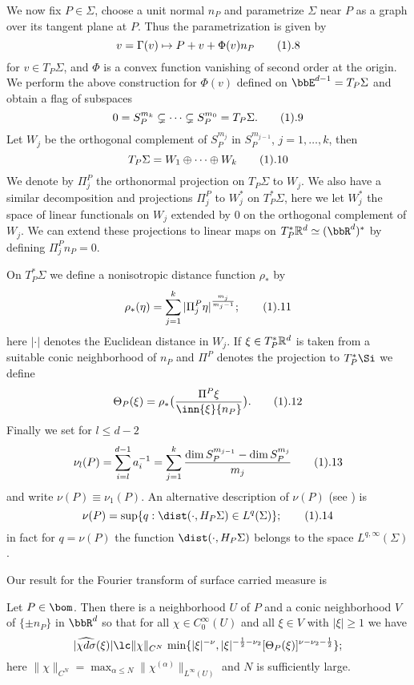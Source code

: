 We now fix  $P\in \Sigma$, choose a unit normal
$n_P$ and parametrize $\Sigma$ near $P$ as  a graph over 
its tangent plane at $P$. Thus the parametrization is given by
$$v=\Gamma(v)\mapsto P+v+ \Phi(v) n_P
\tag 1.8
$$ for $v\in T_P\Sigma$, and 
 $\Phi$ is a convex function  vanishing of second order at the origin.
We perform the above construction for $\Phi(v)$  defined on 
$\bbE^{d-1}=T_P\Sigma$ and obtain a flag of subspaces
$$0=S^{m_k}_P\subsetneq\dots \subsetneq S^{m_0}_P= T_P\Sigma. 
\tag 1.9
$$
%
Let  $W_j$ be the orthogonal complement of
$S^{m_{j}}_P$ in $S^{m_{j-1}}_P$, $j=1,\dots,k$, then
$$
T_P\Sigma= W_1\oplus\cdots\oplus W_{k}
\tag 1.10
$$
We denote by $\Pi_j^P$ the orthonormal projection on $T_P\Sigma$  to
$W_j$.
We also have a similar decomposition and projections $\Pi_j^P$ to $W_j^*$
on $T^*_P\Sigma$, here we let $W_j^*$ the space of linear functionals 
on $W_j$ extended by $0$ on the orthogonal complement of $W_j$.
We can extend these projections to linear maps  on 
$T_P^*\Bbb R^d\simeq (\bbR^d)^*$ by
defining $\Pi_j^P n_P=0$.


On $T_P^*\Sigma$ we define a nonisotropic  distance function $\rho_*$ by
$$
\rho_*(\eta)=
\sum_{j=1}^k 
|\Pi_j^P\eta|^{\frac{m_j}{m_j-1}};
\tag 1.11
$$
here $|\cdot|$ denotes the Euclidean distance in $W_j$.
If $\xi\in T_P^*\Bbb R^d$ is taken from a suitable 
 conic neighborhood of  $n_P$ and $\Pi^P$ denotes the  projection
to $T_P^*\Si$ 
 we define
 $$\Theta_P(\xi)=\rho_*\big(\frac{\Pi^P \xi}{\inn{\xi}{n_P}}\big).
\tag 1.12
$$
Finally   we set  for $l\le d-2$
$$\nu_l(P)= \sum_{i=l}^{d-1} a_i^{-1}=\sum_{j=1}^k 
\frac {\dim S_P^{m_{j-1}}-\dim S_P^{m_j}}{m_j}
\tag 1.13
$$
and write $\nu(P)\equiv \nu_1(P)$. An alternative description of $\nu(P)$ 
 (see \cite{16}) is
$$\nu(P)=\sup\{q:\dist(\cdot,H_P\Sigma)\in L^q(\Sigma)\};
\tag 1.14
$$
in fact for $q=\nu(P)$ the function $\dist(\cdot,H_P\Sigma)$ belongs to
the space $ L^{q,\infty}(\Sigma)$.

Our result for the Fourier transform of surface carried measure is 

Let $P\in \bom$.
Then there is a neighborhood $U$ of $P$ and a conic 
neighborhood $V$ of  $\{\pm n_P\}$ in $\bbR^d$ so that for all 
$\chi\in C^\infty_0(U)$ and all $\xi\in V$ with $|\xi|\ge 1$ we have
$$|\widehat{\chi d\sigma}(\xi)|\lc\|\chi\|_{C^{N}}\,
\min\{|\xi|^{-\nu},   |\xi|^{-\frac 12-\nu_2} [\Theta_P(\xi)]^{\nu-\nu_2-\frac 12}\};
$$
here $\|\chi\|_{C^N}=\max_{\alpha\le N}\|\chi^{(\alpha)}\|_{L^\infty(U)}$ and $N$ is sufficiently large.
\endproclaim

